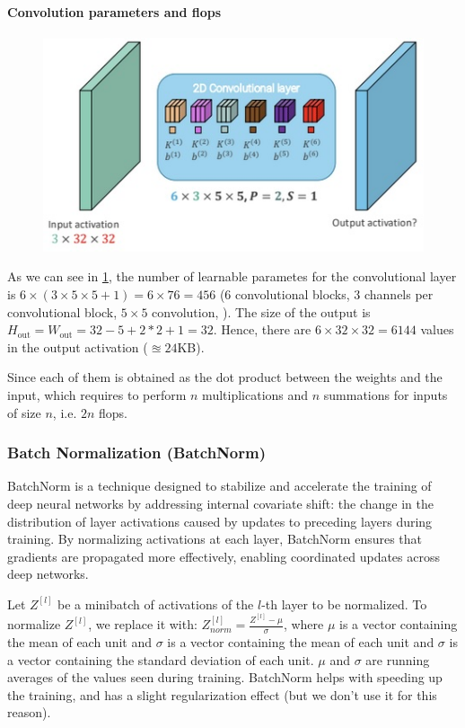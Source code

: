 \paragraph{Convolution parameters and flops}

\begin{figure}[htbp]
  \centering
  \includegraphics[width=0.8\linewidth]{./img/convolutions_flops.jpg}
  \caption{}
  \label{fig:convolutions_flops}
\end{figure}

As we can see in \ref{fig:convolutions_flops}, the number of learnable parametes for the convolutional layer is $6 \times (3 \times 5 \times 5 + 1) = 6 \times 76 = 456$ (6 convolutional blocks, 3 channels per convolutional block, $5 \times 5$ convolution, ).
The size of the output is $H_\text{{out}} = W_\text{{out}} = 32 - 5 + 2 * 2 + 1 = 32$.
Hence, there are $6 \times 32 \times 32 = 6144$ values in the output activation ($\approxeq 24$KB).

Since each of them is obtained as the dot product between the weights and the input, which requires to perform $n$ multiplications and $n$ summations for inputs of size $n$, i.e. $2n$ flops.

\subsubsection{Batch Normalization (BatchNorm)}
BatchNorm is a technique designed to stabilize and accelerate the training of deep neural networks by addressing internal covariate shift: the change in the distribution of layer activations caused by updates to preceding layers during training.
By normalizing activations at each layer, BatchNorm ensures that gradients are propagated more effectively, enabling coordinated updates across deep networks.

Let $Z^{[l]}$ be a minibatch of activations of the $l$-th layer to be normalized.
To normalize $Z^{[l]}$, we replace it with: $Z^{[l]}_{norm} = \frac{Z^[l] - \mu}{\sigma}$, where $\mu$ is a vector containing the mean of each unit and $\sigma$ is a vector containing the mean of each unit and $\sigma$ is a vector containing the standard deviation of each unit.
$\mu$ and $\sigma$ are running averages of the values seen during training.
BatchNorm helps with speeding up the training, and has a slight regularization effect (but we don't use it for this reason).

